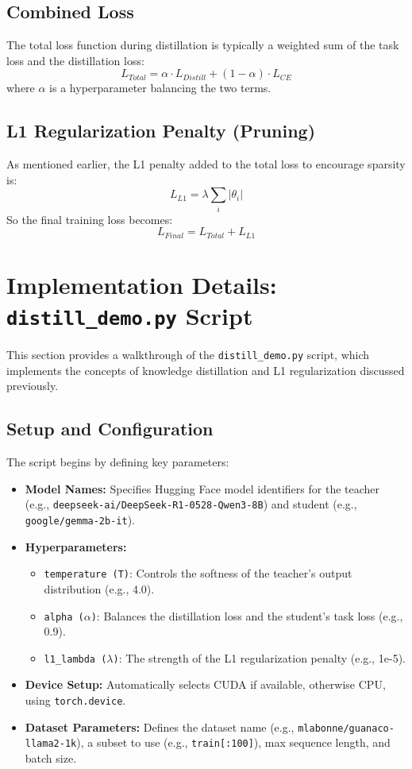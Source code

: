 \documentclass[12pt, a4paper]{report}
\begin{document}
\subsection{Combined Loss}
The total loss function during distillation is typically a weighted sum of the task loss and the distillation loss:
$$ L_{Total} = \alpha \cdot L_{Distill} + (1 - \alpha) \cdot L_{CE} $$
where $\alpha$ is a hyperparameter balancing the two terms.

\subsection{L1 Regularization Penalty (Pruning)}
As mentioned earlier, the L1 penalty added to the total loss to encourage sparsity is:
$$ L_{L1} = \lambda \sum_i |\theta_i| $$
So the final training loss becomes:
$$ L_{Final} = L_{Total} + L_{L1} $$

\section{Implementation Details: \texttt{distill\_demo.py} Script}
\label{sec:distill_demo_walkthrough}
This section provides a walkthrough of the \texttt{distill\_demo.py} script, which implements the concepts of knowledge distillation and L1 regularization discussed previously.

\subsection{Setup and Configuration}
The script begins by defining key parameters:
\begin{itemize}
    \item \textbf{Model Names:} Specifies Hugging Face model identifiers for the teacher (e.g., \texttt{deepseek-ai/DeepSeek-R1-0528-Qwen3-8B}) and student (e.g., \texttt{google/gemma-2b-it}).
    \item \textbf{Hyperparameters:}
    \begin{itemize}
        \item \texttt{temperature (T)}: Controls the softness of the teacher's output distribution (e.g., 4.0).
        \item \texttt{alpha ($\alpha$)}: Balances the distillation loss and the student's task loss (e.g., 0.9).
        \item \texttt{l1\_lambda ($\lambda$)}: The strength of the L1 regularization penalty (e.g., 1e-5).
    \end{itemize}
    \item \textbf{Device Setup:} Automatically selects CUDA if available, otherwise CPU, using \texttt{torch.device}.
    \item \textbf{Dataset Parameters:} Defines the dataset name (e.g., \texttt{mlabonne/guanaco-llama2-1k}), a subset to use (e.g., \texttt{train[:100]}), max sequence length, and batch size.
\end{itemize}
\end{document}
